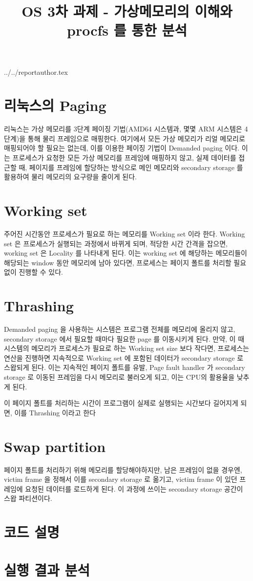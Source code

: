 \documentclass {article}
\begin{document}
\title {OS 3차 과제 - 가상메모리의 이해와 procfs 를 통한 분석}
 {../../reportauthor.tex}
\maketitle


\section {리눅스의 Paging}
리눅스는 가상 메모리를 3단계 페이징 기법(AMD64 시스템과, 몇몇 ARM 시스템은 4단계)을 통해 물리 프레임으로 매핑한다. 여기에서 모든 가상 메모리가 리얼 메모리로 매핑되어야 할 필요는 없는데, 이를 이용한 페이징 기법이 Demanded paging 이다. 이는 프로세스가 요청한 모든 가상 메모리를 프레임에 매핑하지 않고, 실제 데이터를 접근할 때, 페이지를 프레임에 할당하는 방식으로 메인 메모리와 secondary storage 를 활용하여 물리 메모리의 요구량을 줄이게 된다.
\section {Working set}
주어진 시간동안 프로세스가 필요로 하는 메모리를 Working set 이라 한다. Working set 은 프로세스가 실행되는 과정에서 바뀌게 되며, 적당한 시간 간격을 잡으면, working set 은 Locality 를 나타내게 된다. 이는 working set 에 해당하는 메모리들이 해당되는 window 동안 메모리에 남아 있다면, 프로세스는 페이지 폴트를 처리할 필요 없이 진행할 수 있다.
\section {Thrashing}
Demanded paging 을 사용하는 시스템은 프로그램 전체를 메모리에 올리지 않고, secondary storage 에서 필요할 때마다 필요한 page 를 이동시키게 된다. 만약, 이 때 시스템의 메모리가 프로세스가 필요로 하는 Working set size 보다 작다면, 프로세스는 연산을 진행하면 지속적으로 Working set 에 포함된 데이터가 secondary storage 로 스왑되게 된다. 이는 지속적인 페이지 폴트를 유발, Page fault handler 가 secondary storage 로 이동된 프레임을 다시 메모리로 불러오게 되고, 이는 CPU의 활용율을 낮추게 된다.

이 페이지 폴트를 처리하는 시간이 프로그램이 실제로 실행되는 시간보다 길어지게 되면, 이를 Thrashing 이라고 한다 
\section {Swap partition}
페이지 폴트를 처리하기 위해 메모리를 할당해야하지만, 남은 프레임이 없을 경우엔, victim frame 을 정해서 이를 secondary storage 로 옮기고, victim frame 이 있던 프레임에 요청된 데이터를 로드하게 된다. 이 과정에 쓰이는 secondary storage 공간이 스왑 파티션이다.
\section {코드 설명}
\section {실행 결과 분석}
\end{document}
